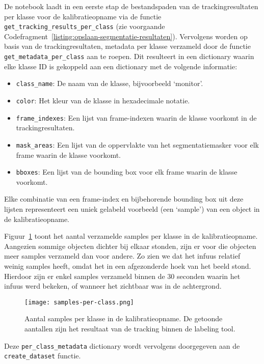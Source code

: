 De notebook laadt in een eerste stap de bestandspaden van de trackingresultaten per klasse 
voor de kalibratieopname via de functie \texttt{get\_tracking\_results\_per\_class} (zie voorgaande Codefragment~\ref{listing:opslaan-segmentatie-resultaten}).
Vervolgens worden op basis van de trackingresultaten, metadata per klasse verzameld door de functie \texttt{get\_metadata\_per\_class} aan te roepen.
Dit resulteert in een dictionary waarin elke klasse ID is gekoppeld aan een dictionary met de volgende informatie:
\begin{itemize}
    \item \texttt{class\_name}: De naam van de klasse, bijvoorbeeld `monitor'.
    \item \texttt{color}: Het kleur van de klasse in hexadecimale notatie.
    \item \texttt{frame\_indexes}: Een lijst van frame-indexen waarin de klasse voorkomt in de trackingresultaten.
    \item \texttt{mask\_areas}: Een lijst van de oppervlakte van het segmentatiemasker voor elk frame waarin de klasse voorkomt.
    \item \texttt{bboxes}: Een lijst van de bounding box voor elk frame waarin de klasse voorkomt.
\end{itemize}
Elke combinatie van een frame-index en bijbehorende bounding box uit deze lijsten representeert 
een uniek gelabeld voorbeeld (een `sample') van een object in de kalibratieopname.

Figuur~\ref{fig:samples-per-class} toont het aantal verzamelde samples per klasse in de kalibratieopname. 
Aangezien sommige objecten dichter bij elkaar stonden, 
zijn er voor die objecten meer samples verzameld dan voor andere.
Zo zien we dat het infuus relatief weinig samples heeft, omdat het in een afgezonderde hoek van het beeld stond.
Hierdoor zijn er enkel samples verzameld binnen de 30 seconden waarin het infuus werd bekeken, 
of wanneer het zichtbaar was in de achtergrond.

\begin{figure}[H]
    \centering
    \texttt{[image: samples-per-class.png]}
    \caption[Aantal samples per klasse in de kalibratieopname]{
        \label{fig:samples-per-class}
        Aantal samples per klasse in de kalibratieopname.
        De getoonde aantallen zijn het resultaat van de tracking binnen de labeling tool.
      }
\end{figure}

Deze \texttt{per\_class\_metadata} dictionary wordt vervolgens doorgegeven aan de \texttt{create\_dataset} functie.

